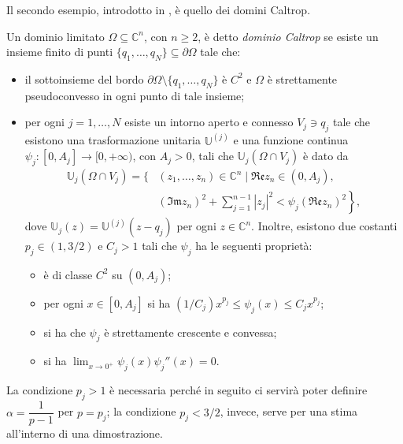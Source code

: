 Il secondo esempio, introdotto in \cite{BM}, è quello dei domini Caltrop.

\begin{defn} \label{defcaltrop}
    Un dominio limitato $\Omega\subseteq\mathbb{C}^n$, con $n\ge 2$, è detto \textit{dominio Caltrop} se esiste un insieme finito di punti $\{q_1,\dots,q_N\}\subseteq\partial\Omega$ tale che:
    \begin{itemize}
        \item il sottoinsieme del bordo $\partial\Omega\setminus\{q_1,\dots,q_N\}$ è $C^2$ e $\Omega$ è strettamente pseudoconvesso in ogni punto di tale insieme;
        \item per ogni $j=1,\dots, N$ esiste un intorno aperto e connesso $V_j\ni q_j$ tale che esistono una trasformazione unitaria $\mathbb{U}^{(j)}$ e una funzione continua $\psi_j:[0,A_j]\longrightarrow[0,+\infty)$, con $A_j>0$, tali che $\mathbb{U}_j(\Omega\cap V_j)$ è dato da
        \begin{align*}
            \mathbb{U}_j(\Omega\cap V_j)=\Bigg\{&(z_1,\dots,z_n)\in\mathbb{C}^n\mid \mathfrak{Re}z_n\in (0,A_j),\\
            &\left.(\mathfrak{Im}z_n)^2+\sum_{j=1}^{n-1}|z_j|^2<\psi_j(\mathfrak{Re}z_n)^2\right\},
        \end{align*}
        dove $\mathbb{U}_j(z)=\mathbb{U}^{(j)}(z-q_j)$ per ogni $z\in\mathbb{C}^n$. Inoltre, esistono due costanti $p_j\in(1,3/2)$ e $C_j>1$ tali che $\psi_j$ ha le seguenti proprietà:
        \begin{itemize}
            \item è di classe $C^2$ su $(0,A_j)$;
            \item per ogni $x\in[0,A_j]$ si ha $(1/C_j)x^{p_j} \le \psi_j(x) \le C_jx^{p_j}$;
            \item si ha che $\psi_j$ è strettamente crescente e convessa;
            \item si ha $\displaystyle\lim_{x\longrightarrow0^+}\psi_j(x)\psi_j''(x)=0$.
        \end{itemize}
    \end{itemize}
\end{defn}

\begin{oss}
    La condizione $p_j>1$ è necessaria perché in seguito ci servirà poter definire $\alpha=\dfrac{1}{p-1}$ per $p=p_j$; la condizione $p_j<3/2$, invece, serve per una stima all'interno di una dimostrazione.
\end{oss}

